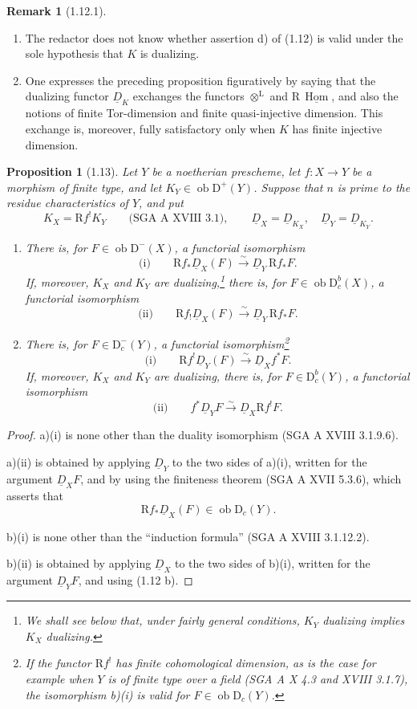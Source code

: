 \documentclass[11pt,a4paper]{article}
\newcommand{\D}{\mathrm{D}}
\newcommand{\ob}{\operatorname{ob}}
\DeclareMathOperator{\Hom}{Hom}
\newcommand{\RHom}{\mathrm{R}\,\underline{\Hom}}
\newcommand{\Ddual}{\underline{D}}
\theoremstyle{plain}
\newtheorem*{propositionstar}{Proposition}
\theoremstyle{definition}
\newtheorem*{remarkstar}{Remark}
\begin{document}
\begin{remarkstar}[1.12.1]
\begin{enumerate}[label=\alph*)]
\item The redactor does not know whether assertion d) of (1.12) is valid under the sole hypothesis that $K$ is dualizing.
\item One expresses the preceding proposition figuratively by saying that the dualizing functor $\Ddual_K$ exchanges the functors $\otimes^{\mathrm L}$ and $\RHom$, and also the notions of finite Tor-dimension and finite quasi-injective dimension. This exchange is, moreover, fully satisfactory only when $K$ has finite injective dimension.
\end{enumerate}
\end{remarkstar}

\begin{propositionstar}[1.13]
Let $Y$ be a noetherian prescheme, let $f:X\to Y$ be a morphism of finite type, and let $K_Y\in\ob\D^+(Y)$. Suppose that $n$ is prime to the residue characteristics of $Y$, and put
\[
K_X=\mathrm Rf^!K_Y\qquad\text{(SGA A XVIII 3.1)},\qquad
\Ddual_X=\Ddual_{K_X},\quad \Ddual_Y=\Ddual_{K_Y}.
\]
\begin{enumerate}[label=\alph*)]
\item There is, for $F\in\ob\D^-(X)$, a functorial isomorphism
\[
\text{(i)}\qquad \mathrm Rf_*\Ddual_X(F)\xrightarrow{\sim}\Ddual_Y\,\mathrm Rf_*F.
\]
If, moreover, $K_X$ and $K_Y$ are dualizing,\footnote{We shall see below that, under fairly general conditions, $K_Y$ dualizing implies $K_X$ dualizing.} there is, for $F\in\ob\D_c^b(X)$, a functorial isomorphism
\[
\text{(ii)}\qquad \mathrm Rf_!\Ddual_X(F)\xrightarrow{\sim}\Ddual_Y\,\mathrm Rf_*F.
\]
\item There is, for $F\in\D_c^-(Y)$, a functorial isomorphism\footnote{If the functor $\mathrm Rf^!$ has finite cohomological dimension, as is the case for example when $Y$ is of finite type over a field (SGA A X 4.3 and XVIII 3.1.7), the isomorphism b)(i) is valid for $F\in\ob\D_c(Y)$.}
\[
\text{(i)}\qquad \mathrm Rf^!\Ddual_Y(F)\xrightarrow{\sim}\Ddual_X f^*F.
\]
If, moreover, $K_X$ and $K_Y$ are dualizing, there is, for $F\in\D_c^b(Y)$, a functorial isomorphism
\[
\text{(ii)}\qquad f^*\Ddual_YF\xrightarrow{\sim}\Ddual_X\mathrm Rf^!F.
\]
\end{enumerate}
\end{propositionstar}

\begin{proof}
a)(i) is none other than the duality isomorphism (SGA A XVIII 3.1.9.6).

a)(ii) is obtained by applying $\Ddual_Y$ to the two sides of a)(i), written for the argument $\Ddual_XF$, and by using the finiteness theorem (SGA A XVII 5.3.6), which asserts that
\[
\mathrm Rf_*\Ddual_X(F)\in\ob\D_c(Y).
\]

b)(i) is none other than the ``induction formula'' (SGA A XVIII 3.1.12.2).

b)(ii) is obtained by applying $\Ddual_X$ to the two sides of b)(i), written for the argument $\Ddual_YF$, and using (1.12 b).
\end{proof}
\end{document}

